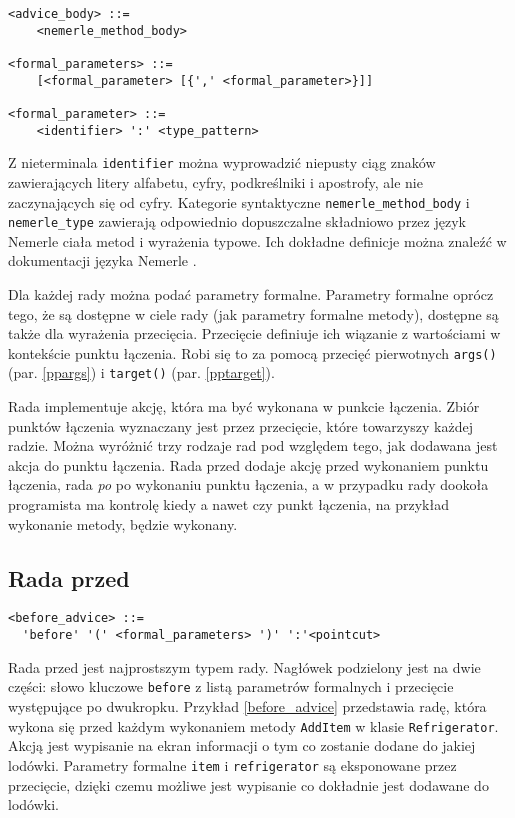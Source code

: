 \documentclass[a4paper,12pt]{mwbk}
\begin{document}
\begin{lstlisting}[style=grammar]
<advice_body> ::=
    <nemerle_method_body>

<formal_parameters> ::= 
    [<formal_parameter> [{',' <formal_parameter>}]]

<formal_parameter> ::=
    <identifier> ':' <type_pattern>
\end{lstlisting}

Z nieterminala \lstinline!identifier! można wyprowadzić niepusty ciąg znaków
zawierających litery alfabetu, cyfry, podkreślniki i apostrofy, ale nie
zaczynających się od cyfry. Kategorie syntaktyczne
\lstinline!nemerle_method_body!  i \lstinline!nemerle_type! zawierają
odpowiednio dopuszczalne składniowo przez język Nemerle ciała metod i wyrażenia
typowe. Ich dokładne definicje można znaleźć w dokumentacji języka Nemerle
\cite{nemerle}.

Dla każdej rady można podać parametry formalne.  Parametry formalne oprócz
tego, że są dostępne w ciele rady (jak parametry formalne metody), dostępne są
także dla wyrażenia przecięcia. Przecięcie definiuje ich wiązanie z wartościami
w kontekście punktu łączenia. Robi się to za pomocą przecięć pierwotnych
\lstinline!args()! (par. \ref{ppargs}) i \lstinline!target()! (par. \ref{pptarget}). 


Rada implementuje akcję, która ma być wykonana w punkcie łączenia. Zbiór
punktów łączenia wyznaczany jest przez przecięcie, które towarzyszy każdej
radzie. Można wyróżnić trzy rodzaje rad pod względem tego, jak dodawana jest
akcja do punktu łączenia. Rada przed dodaje akcję przed wykonaniem punktu
łączenia, rada \emph{po} po wykonaniu punktu łączenia, a w przypadku rady
dookoła programista ma kontrolę kiedy a nawet czy punkt łączenia, na przykład
wykonanie metody, będzie wykonany.

\subsection{Rada przed}
\begin{lstlisting}[style=grammar]
<before_advice> ::= 
  'before' '(' <formal_parameters> ')' ':'<pointcut>
\end{lstlisting}

Rada przed jest najprostszym typem rady. Nagłówek podzielony jest na dwie
części: słowo kluczowe \lstinline!before! z listą parametrów formalnych i
przecięcie występujące po dwukropku.  Przykład \ref{before_advice} przedstawia
radę, która wykona się przed każdym wykonaniem metody \lstinline!AddItem! w
klasie \lstinline!Refrigerator!. Akcją jest wypisanie na ekran informacji o tym
co zostanie dodane do jakiej lodówki. Parametry formalne \lstinline!item! i
\lstinline!refrigerator! są eksponowane przez przecięcie, dzięki czemu możliwe
jest wypisanie co dokładnie jest dodawane do lodówki.
\end{document}
